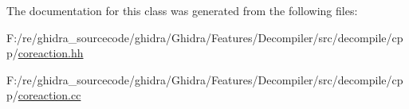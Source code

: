 The documentation for this class was generated from the following files\+:\begin{DoxyCompactItemize}
\item 
F\+:/re/ghidra\+\_\+sourcecode/ghidra/\+Ghidra/\+Features/\+Decompiler/src/decompile/cpp/\mbox{\hyperlink{coreaction_8hh}{coreaction.\+hh}}\item 
F\+:/re/ghidra\+\_\+sourcecode/ghidra/\+Ghidra/\+Features/\+Decompiler/src/decompile/cpp/\mbox{\hyperlink{coreaction_8cc}{coreaction.\+cc}}\end{DoxyCompactItemize}
